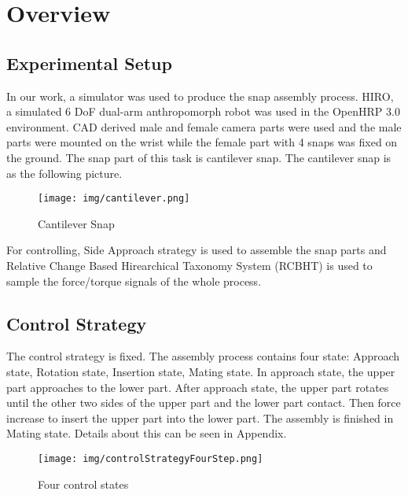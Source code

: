 %

\chapter{Overview}
\section{Experimental Setup}
In our work, a simulator was used to produce the snap assembly process. HIRO, a simulated 6 DoF dual-arm anthropomorph robot was used in the OpenHRP 3.0 environment. CAD derived male and female camera parts were used and the male parts were mounted on the wrist while the female part with 4 snaps was fixed on the ground. The snap part of this task is cantilever snap. The cantilever snap is as the following picture. \\
\begin{figure}
    \centering
    \texttt{[image: img/cantilever.png]}
    \caption{Cantilever Snap}
    \label{snap}
\end{figure}
\indent For controlling, Side Approach strategy is used to assemble the snap parts and Relative Change Based Hirearchical Taxonomy System (RCBHT) is used to sample the force/torque signals of the whole process.
\section{Control Strategy}
The control strategy is fixed. The assembly process contains four state: Approach state, Rotation state, Insertion state, Mating state. In approach state, the upper part approaches to the lower part. After approach state, the upper part rotates until the other two sides of the upper part and the lower part contact. Then force increase to insert the upper part into the lower part. The assembly is finished in Mating state. Details about this can be seen in Appendix.\\
\begin{figure}[h]
    \centering
    \texttt{[image: img/controlStrategyFourStep.png]}
    \caption{Four control states}
    \label{RCBHT}
\end{figure} 
